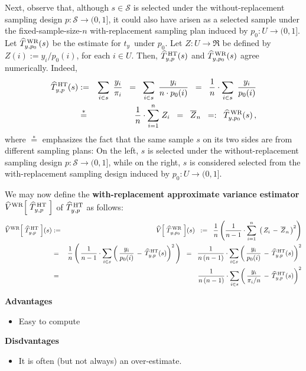 Next, observe that, although \;$s \in \mathcal{S}$\; is selected under the
without-replacement sampling design \;$p : \mathcal{S} \longrightarrow (0,1]$,\;
it could also have arisen as a selected sample under the fixed-sample-size-$n$
with-replacement sampling plan induced by \;$p_{0} : U \longrightarrow (0,1]$.\;
Let \;$\widehat{T}^{\,\textnormal{WR}}_{y,p_{0}}(s)$\; be the estimate for
\;$t_{y}$\, under \;$p_{0}$.\;
Let \;$Z : U \longrightarrow \Re$\; be defined by
\;$Z(i) := y_{i} / p_{0}(i)$,\; for each \;$i \in U$.\;
Then,
\;$\widehat{T}^{\,\textnormal{HT}}_{y,p}(s)$\; and
\;$\widehat{T}^{\,\textnormal{WR}}_{y,p_{0}}(s)$\;
agree numerically.
Indeed,
\begin{eqnarray*}
\widehat{T}^{\,\textnormal{HT}}_{y,p}(s)
& := &
	\underset{i \in s}{\sum}\;\, \dfrac{y_{i}}{\pi_{i}}
\;\; = \;\;
	\underset{i \in s}{\sum}\;\, \dfrac{y_{i}}{n \cdot p_{0}(i)}
\;\; = \;\;
	\dfrac{1}{n}\cdot \underset{i \in s}{\sum}\;\, \dfrac{y_{i}}{p_{0}(i)}
\\
& \overset{*}{=} &
	\dfrac{1}{n}\cdot \overset{n}{\underset{i = 1}{\sum}}\; Z_{i}
\;\; = \;\;
	\overline{Z}_{n}
\;\; =: \;\;
	\widehat{T}^{\,\textnormal{WR}}_{y,p_{0}}(s)\,,
\end{eqnarray*}
where \;$\overset{*}{=}$\; emphasizes the fact that the same sample \;$s$\;
on its two sides are from different sampling plans:
On the left, \;$s$\; is selected under the without-replacement sampling design
$p : \mathcal{S} \longrightarrow (0,1]$, while on the right,
\;$s$\; is considered selected from the with-replacement sampling design
induced by \;$p_{0} : U \longrightarrow (0,1]$.

\vskip 0.5cm
\noindent
We may now define the
\textbf{with-replacement approximate variance estimator}
\;$\widehat{V}^{\textnormal{WR}}\!\left[\;\widehat{T}^{\,\textnormal{HT}}_{y,p}\;\right]$\;
of \;$\widehat{T}^{\,\textnormal{HT}}_{y,p}$\; as follows:
\begin{eqnarray*}
\widehat{V}^{\textnormal{WR}}\!\left[\;\widehat{T}^{\,\textnormal{HT}}_{y,p}\;\right]\!(s)
& := &
	\widehat{V}\!\left[\;\widehat{T}^{\,\textnormal{WR}}_{y,p_{0}}\;\right]\!(s)
\;\; := \;\;
	\dfrac{1}{n}\left(
		\dfrac{1}{n-1}\cdot\overset{n}{\underset{i=1}{\sum}}\;
		\left(\,Z_{i}\,-\,\overline{Z}_{n}\,\right)^{2}
		\right)
\\
& = &
	\dfrac{1}{n}\left(\,
		\dfrac{1}{n-1}\cdot\underset{i \in s}{\sum}
		\left(\,\dfrac{y_{i}}{p_{0}(i)}\,-\,\widehat{T}^{\,\textnormal{HT}}_{y,p}(s)\right)^{2}
		\,\right)
\;\; = \;\;
	\dfrac{1}{n\,(n-1)}\cdot\underset{i \in s}{\sum}
		\left(\,
		\dfrac{y_{i}}{p_{0}(i)}\,-\,\widehat{T}^{\,\textnormal{HT}}_{y,p}(s)
		\right)^{2}
\\
& = &
	\dfrac{1}{n\,(n-1)}\cdot\underset{i \in s}{\sum}
		\left(\,
		\dfrac{y_{i}}{\pi_{i}/n}\,-\,\widehat{T}^{\,\textnormal{HT}}_{y,p}(s)
		\right)^{2}
\end{eqnarray*}

\vskip 0.5cm
\noindent
\textbf{Advantages}
\begin{itemize}
\item
	Easy to compute
\end{itemize}

\vskip 0.5cm
\noindent
\textbf{Disdvantages}
\begin{itemize}
\item
	It is often (but not always) an over-estimate.
\end{itemize}


